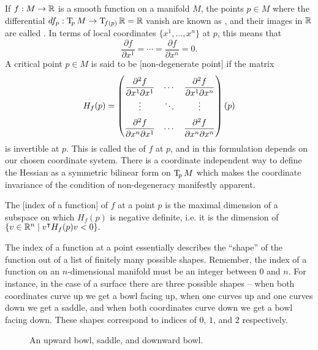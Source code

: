 If $f : M \to \mathbb{R}$ is a smooth function on a manifold $M$, the points $p\in M$ where the differential $df_p : \operatorname{T\!}_p M \to \operatorname{T\!}_{f(p)} \mathbb{R} = \mathbb{R}$ vanish are known as , and their images in $\mathbb{R}$ are called . In terms of local coordinates $\{x^1,\ldots, x^n\}$ at $p$, this means that
\begin{equation}
	\frac{\partial f}{\partial x^1}=\cdots=\frac{\partial f}{\partial x^n} = 0.
\end{equation}
A critical point $p\in M$ is said to be [non-degenerate point] if the matrix
\begin{equation}
	\everymath={\displaystyle}
	\renewcommand*{\arraystretch}{2}
	H_f(p) = \begin{pmatrix}
		\frac{\partial^2 f}{\partial x^1\partial x^1} & \cdots &
		\frac{\partial^2 f}{\partial x^1\partial x^n}                   \\
		\vdots                                        & \ddots & \vdots \\
		\frac{\partial^2 f}{\partial x^n\partial x^1} & \cdots &
		\frac{\partial^2 f}{\partial x^n\partial x^n}                   \\
	\end{pmatrix}(p)
\end{equation}
is invertible at $p$. This is called the  of $f$ at $p$, and in this formulation depends on our chosen coordinate system.
There is a coordinate independent way to define the Hessian as a symmetric bilinear form on $\operatorname{T\!}_p M$ which makes the coordinate invariance of the condition of non-degeneracy manifestly apparent.

\begin{definition}
	The [index of a function] of $f$ at a point $p$ is the maximal dimension of a subspace on which $H_f(p)$ is negative definite, i.e. it is the dimension of $\{v\in \mathbb{R}^n \mid v^\intercal H_f(p) v < 0\}.$
\end{definition}

The index of a function at a point essentially describes the ``shape'' of the function out of a list of finitely many possible shapes. Remember, the index of a function on an $n$-dimensional manifold must be an integer between $0$ and $n$. For instance, in the case of a surface there are three possible shapes -- when both coordinates curve up we get a bowl facing up, when one curves up and one curves down we get a saddle, and when both coordinates curve down we get a bowl facing down. These shapes correspond to indices of $0$, $1$, and $2$ respectively.
\begin{figure}[ht]
	\centering
	\medskip
	\caption{An upward bowl, saddle, and downward bowl.}
\end{figure}

